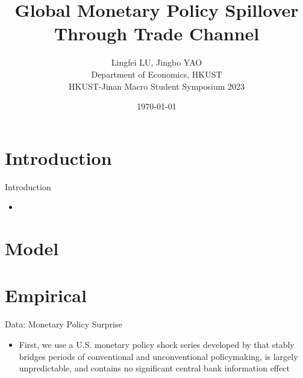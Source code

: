 \documentclass[10pt]{beamer}
\title[Monetary Policy Spillover Through Trade Channel]{Global Monetary Policy Spillover Through Trade Channel}
\author[Yao\&Lu (2023)]{\large Lingfei LU, Jingbo YAO \\ \vspace{0.5cm} Department of Economics, HKUST \\ \vspace{0.5cm} HKUST-Jinan Macro Student Symposium 2023}
\date{\today}
\begin{document}
	
    \begin{frame}[plain]
	\maketitle {}
    \end{frame}


\section{Introduction}

\begin{frame}{Introduction}
	\begin{itemize}
		\item 
	\end{itemize}
\end{frame}

\section{Model}

\section{Empirical}

\begin{frame}{Data: Monetary Policy Surprise}
    \begin{itemize}
        \item First, we use a U.S. monetary policy shock series developed by \cite{brw2021}
        that stably bridges periods of conventional and unconventional policymaking, is largely unpredictable, and contains no significant central bank information effect
    \end{itemize}
\end{frame}
\end{document}
